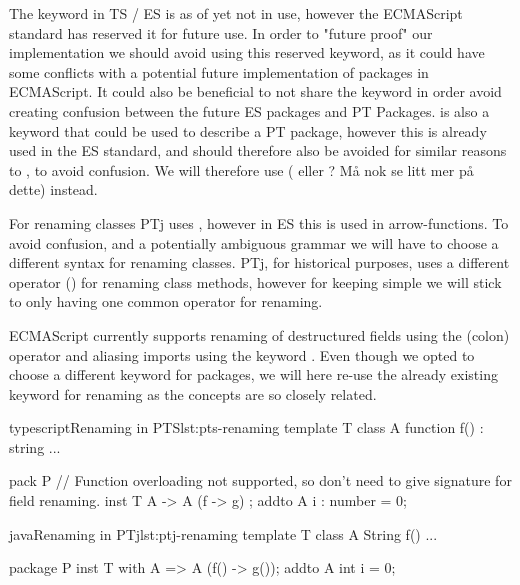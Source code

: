 The keyword  in TS / ES is as of yet not in use, however the ECMAScript standard has reserved it for future use.
In order to "future proof" our implementation we should avoid using this reserved keyword, as it could have some conflicts with a potential future implementation of packages in ECMAScript.
It could also be beneficial to not share the keyword in order avoid creating confusion between the future ES packages and PT Packages.
 is also a keyword that could be used to describe a PT package, however this is already used in the ES standard, and should therefore also be avoided for similar reasons to , to avoid confusion.
We will therefore use ( eller ? Må nok se litt mer på dette) instead. %

For renaming classes PTj uses \codeword{=>}, however in ES this is used in arrow-functions\cite{arrowfunction}.
To avoid confusion, and a potentially ambiguous grammar we will have to choose a different syntax for renaming classes.
PTj, for historical purposes, uses a different operator (\codeword{->}) for renaming class methods, however for keeping \plname{} simple we will stick to only having one common operator for renaming.

ECMAScript currently supports renaming of destructured fields using the \codeword{:}(colon) operator and aliasing imports using the keyword .
Even though we opted to choose a different keyword for packages, we will here re-use the already existing  keyword for renaming as the concepts are so closely related.

\begin{code}{typescript}{Renaming in PTS}{lst:pts-renaming}
    template T {
        class A {
            function f() : string {
                ...
            }
        }
    }

    pack P {
        // Function overloading not supported, so don't need to give signature for field renaming.
        inst T { A -> A (f -> g) };
        addto A {
            i : number = 0;
        }
    }
\end{code}

\begin{code}{java}{Renaming in PTj}{lst:ptj-renaming}
    template T {
        class A {
            String f() {
                ...
            }
        }
    }

    package P {
        inst T with A => A (f() -> g());
        addto A {
            int i = 0;
        }
    }
\end{code}


